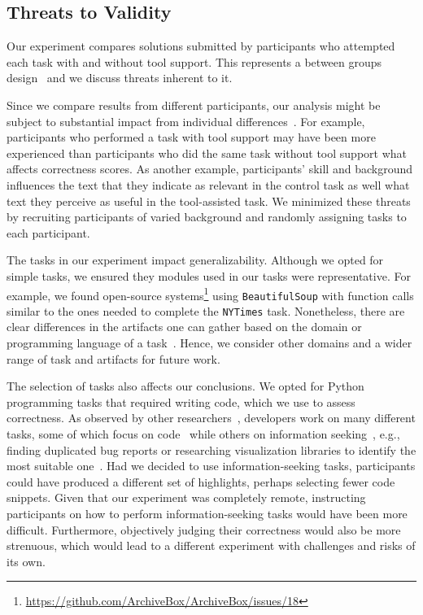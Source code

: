 
\subsection{Threats to Validity}
\label{cp6:threats}




Our experiment compares solutions submitted by participants who attempted each task with and without tool support. 
This represents a between groups design~\cite{Lazar2017} and we discuss threats inherent to it. 



Since we compare results from different participants, our analysis might be subject to substantial 
impact from individual differences~\cite{Lazar2017}. 
For example, participants who performed a task with tool support may have been more experienced than participants 
who did the same task without tool support what affects correctness scores.
As another example,  participants' skill and background 
influences the text that they indicate as relevant in the control task as well 
what text they perceive as useful in the tool-assisted task. 
We minimized these threats by recruiting participants of varied background and randomly
assigning tasks to each participant.



The tasks in our experiment impact generalizability. 
Although we opted for simple tasks, we ensured they 
modules used in our tasks were representative. 
For example, we found open-source systems\footnote{\url{https://github.com/ArchiveBox/ArchiveBox/issues/18}} using \texttt{BeautifulSoup} 
with function calls similar to the ones needed to complete the \texttt{NYTimes} task.
Nonetheless, there are clear differences in the artifacts one can gather 
based on the domain or programming language of a task~\cite{baltes2020}.
Hence, we consider other domains and a wider range of task 
and artifacts for future work. 



The selection of tasks also affects our conclusions. We opted for Python programming tasks that 
required writing code, which we use to assess correctness. 
As observed by other researchers~\cite{satterfield2020, meyer2020}, developers
work on many different tasks, some of which focus on code~\cite{Meyer2017}
while others on information seeking~\cite{gonccalves2011}, e.g., finding duplicated bug reports or researching visualization libraries to identify the most suitable one~\cite{satterfield2020}.
Had we decided to use information-seeking tasks, participants could have produced a different set of highlights,
perhaps selecting fewer code snippets. 
Given that 
our experiment was completely remote, instructing participants on how to perform information-seeking 
tasks would have been more difficult. Furthermore, objectively judging their correctness 
would also be more strenuous, which would lead to a different experiment with challenges and risks of its own.





